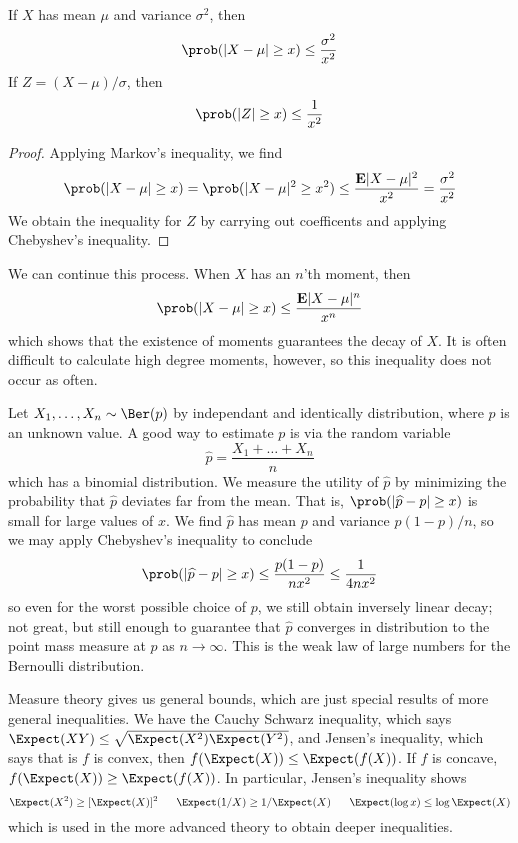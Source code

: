 \begin{theorem}
    If $X$ has mean $\mu$ and variance $\sigma^2$, then
    \[ \prob(|X - \mu| \geq x) \leq \frac{\sigma^2}{x^2} \]
    If $Z = (X - \mu)/\sigma$, then
    \[ \prob(|Z| \geq x) \leq \frac{1}{x^2} \]
\end{theorem}
\begin{proof}
    Applying Markov's inequality, we find
    \[ \prob(|X - \mu| \geq x) = \prob(|X - \mu|^2 \geq x^2) \leq \frac{\mathbf{E}|X - \mu|^2}{x^2} = \frac{\sigma^2}{x^2} \]
    We obtain the inequality for $Z$ by carrying out coefficents and applying Chebyshev's inequality.
\end{proof}

We can continue this process. When $X$ has an $n$'th moment, then
%
\[ \prob(|X - \mu| \geq x) \leq \frac{\mathbf{E}|X - \mu|^n}{x^n} \]
%
which shows that the existence of moments guarantees the decay of $X$. It is often difficult to calculate high degree moments, however, so this inequality does not occur as often.

\begin{example}
    Let $X_1, \dots, X_n \sim \Ber(p)$ by independant and identically distribution, where $p$ is an unknown value. A good way to estimate $p$ is via the random variable
    \[ \widehat{p} = \frac{X_1 + \dots + X_n}{n} \]
    which has a binomial distribution. We measure the utility of $\widehat{p}$ by minimizing the probability that $\widehat{p}$ deviates far from the mean. That is, $\prob(|\widehat{p} - p| \geq x)$ is small for large values of $x$. We find $\widehat{p}$ has mean $p$ and variance $p(1-p)/n$, so we may apply Chebyshev's inequality to conclude
    \[ \prob(|\widehat{p} - p| \geq x) \leq \frac{p(1-p)}{nx^2} \leq \frac{1}{4nx^2} \]
    so even for the worst possible choice of $p$, we still obtain inversely linear decay; not great, but still enough to guarantee that $\widehat{p}$ converges in distribution to the point mass measure at $p$ as $n \to \infty$. This is the weak law of large numbers for the Bernoulli distribution.
\end{example}

Measure theory gives us general bounds, which are just special results of more general inequalities. We have the Cauchy Schwarz inequality, which says $\Expect(XY) \leq \sqrt{\Expect(X^2) \Expect(Y^2)}$, and Jensen's inequality, which says that is $f$ is convex, then $f(\Expect(X)) \leq \Expect(f(X))$. If $f$ is concave, $f(\Expect(X)) \geq \Expect(f(X))$. In particular, Jensen's inequality shows
%
\[ \Expect(X^2) \geq [\Expect(X)]^2\ \ \ \ \ \Expect(1/X) \geq 1/\Expect(X)\ \ \ \ \ \Expect(\log x) \leq \log \Expect(X) \]
%
which is used in the more advanced theory to obtain deeper inequalities.


